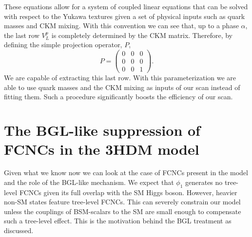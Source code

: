\documentclass[10pt]{report}
\begin{document}
%
These equations allow for a system of coupled linear equations that can be solved with respect to the Yukawa textures given a set of physical inputs such as quark masses and CKM mixing. 
%
With this convention we can see that, up to a phase $\alpha$, the last row $V^p_L$ is completely determined by the CKM matrix.
%
Therefore, by defining the simple projection operator, $P$, 
%
\begin{equation}
P = 
\begin{pmatrix}
0 & 0 & 0 \\ 
0 & 0 & 0 \\ 
0 & 0 & 1 
\end{pmatrix}. 
\end{equation}
We are capable of extracting this last row. With this parameterization we are able to use quark masses and the CKM mixing as inputs of our scan instead of fitting them. Such a procedure significantly boosts the efficiency of our scan. 

\section{The BGL-like suppression of FCNCs in the 3HDM model}

Given what we know now we can look at the case of FCNCs present in the model and the role of the BGL-like mechanism. 
%
We expect that $\phi_1$ generates no tree-level FCNCs given its full overlap with the SM Higgs boson. 
%
However, heavier non-SM states feature tree-level FCNCs. This can severely constrain our model unless the couplings of BSM-scalars to the SM are small enough to compensate such a tree-level effect. This is the motivation behind the BGL treatment as discussed. 
\end{document}
